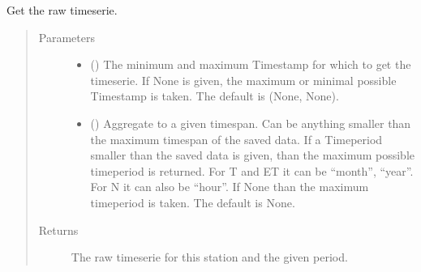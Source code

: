 \documentclass[letterpaper,10pt,english]{sphinxmanual}
\begin{document}
\begin{fulllineitems}
\begin{fulllineitems}
\label{\detokenize{weatherDB:weatherDB.station.StationBase.get_raw}}
\sphinxAtStartPar
Get the raw timeserie.
\begin{quote}\begin{description}
\item[{Parameters}] \leavevmode\begin{itemize}
\item {} 
\sphinxAtStartPar
{} ({\hyperref[\detokenize{weatherDB.lib:weatherDB.lib.utils.TimestampPeriod}]{}}\sphinxstyleliteralemphasis{\sphinxupquote{(}}\sphinxstyleliteralemphasis{\sphinxupquote{)}}\sphinxstyleliteralemphasis{\sphinxupquote{, }}) \textendash{} The minimum and maximum Timestamp for which to get the timeserie.
If None is given, the maximum or minimal possible Timestamp is taken.
The default is (None, None).

\item {} 
\sphinxAtStartPar
{} (\sphinxstyleliteralemphasis{\sphinxupquote{, }}) \textendash{} Aggregate to a given timespan.
Can be anything smaller than the maximum timespan of the saved data.
If a Timeperiod smaller than the saved data is given, than the maximum possible timeperiod is returned.
For T and ET it can be “month”, “year”.
For N it can also be “hour”.
If None than the maximum timeperiod is taken.
The default is None.

\end{itemize}

\item[{Returns}] \leavevmode
\sphinxAtStartPar
The raw timeserie for this station and the given period.


\end{description}
\end{quote}
\end{fulllineitems}
\end{fulllineitems}
\end{document}
